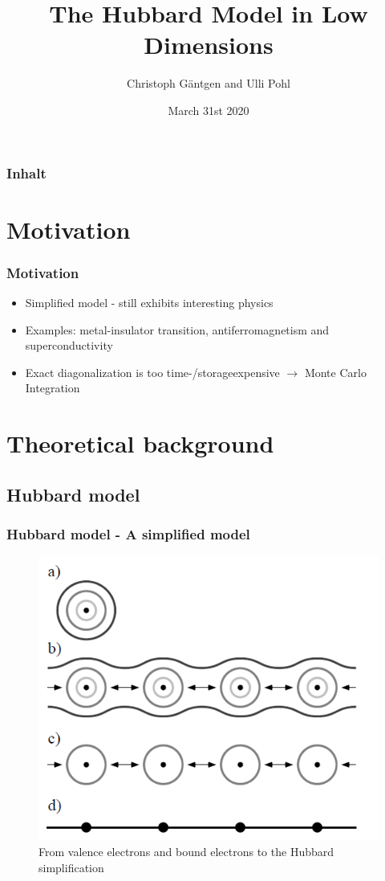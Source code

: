 \documentclass{beamer}
\title{The Hubbard Model in Low Dimensions}
\author{Christoph Gäntgen and Ulli Pohl}
\institute[]{Physikalisches Institut\\
	Rheinische Friedrich-Wilhelms-Universität Bonn}
\date{March 31st 2020}
\begin{document}
\begin{frame}
\titlepage
\end{frame}

\begin{frame}
\frametitle{Inhalt}
\tableofcontents
\end{frame}

\section{Motivation}
\begin{frame}
\frametitle{Motivation}
\begin{itemize}
	\item Simplified model - still exhibits interesting physics 
	\item Examples: metal-insulator transition, antiferromagnetism and superconductivity
	\item Exact diagonalization is too time-/storageexpensive $\rightarrow$ Monte Carlo Integration
\end{itemize}
\end{frame}

\section{Theoretical background}
\subsection{Hubbard model}
\begin{frame}
\frametitle{Hubbard model - A simplified model}
\begin{figure}[h]
	\centering
	\includegraphics[width=0.6\linewidth]{pic0}
	\caption{From valence electrons and bound electrons to the Hubbard simplification}
	\label{fig:pic0}
\end{figure}
\end{frame}
\end{document}
